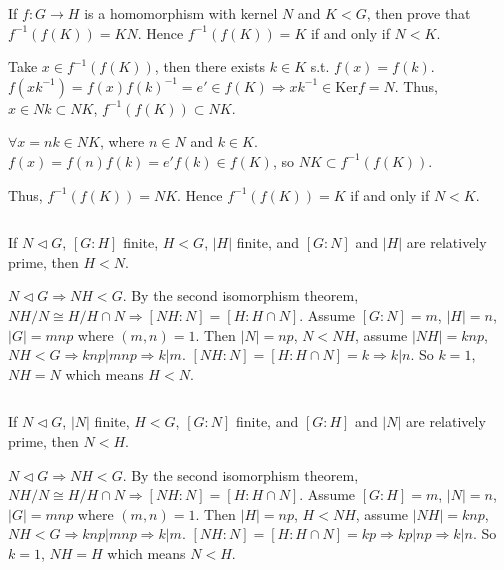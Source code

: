 $$ $$

\begin{ex}
    If $f: G \to H$ is a homomorphism with kernel $N$ and $K<G$, then prove that $f^{-1}(f(K))=KN$. Hence $f^{-1}(f(K))=K$ if and only if $N<K$.
\end{ex}

\begin{answer}
    Take $x\in f^{-1}(f(K))$, then there exists $k\in K$ s.t. $f(x)=f(k)$. $f(xk^{-1})=f(x)f(k)^{-1}=e'\in f(K) \Rightarrow xk^{-1}\in\mathrm{Ker}f=N$. Thus, $x\in Nk\subset NK$, $f^{-1}(f(K))\subset NK$.

    $\forall x=nk\in NK$, where $n\in N$ and $k\in K$. $f(x)=f(n)f(k)=e'f(k)\in f(K)$, so $NK\subset f^{-1}(f(K))$.

    Thus, $f^{-1}(f(K))=NK$. Hence $f^{-1}(f(K))=K$ if and only if $N<K$.
\end{answer}

$$ $$

\begin{ex}
    If $N\lhd G$, $\left[G:H\right]$ finite, $H<G$, $\left| H \right| $ finite, and $\left[G:N\right]$ and $\left| H \right| $ are relatively prime, then $H<N$.
\end{ex}

\begin{answer}
    $N\lhd G\Rightarrow NH<G$. By the second isomorphism theorem, $NH /N\cong H/H\cap N\Rightarrow \left[NH:N\right]=\left[H:H\cap N\right]$. Assume $\left[G:N\right]=m$, $\left| H \right| =n$, $\left| G \right| =mnp$ where $(m,n)=1$. Then $\left| N \right| =np$, $N<NH$, assume $\left| NH \right| =knp$, $NH<G\Rightarrow knp|mnp\Rightarrow k|m$. $\left[NH:N\right]=\left[H:H\cap N\right]=k\Rightarrow k|n$. So $k=1$, $NH=N$ which means $H<N$.
\end{answer}

$$ $$

\begin{ex}
    If $N\lhd G$, $\left| N \right|$ finite, $H<G$, $\left[G:N\right] $ finite, and $\left[G:H\right]$ and $\left| N \right| $ are relatively prime, then $N<H$.
\end{ex}

\begin{answer}
    $N\lhd G\Rightarrow NH<G$. By the second isomorphism theorem, $NH /N\cong H/H\cap N\Rightarrow \left[NH:N\right]=\left[H:H\cap N\right]$. Assume $\left[G:H\right]=m$, $\left| N \right| =n$, $\left| G \right| =mnp$ where $(m,n)=1$. Then $\left| H \right| =np$, $H<NH$, assume $\left| NH \right| =knp$, $NH<G\Rightarrow knp|mnp\Rightarrow k|m$. $\left[NH:N\right]=\left[H:H\cap N\right]=kp\Rightarrow kp|np\Rightarrow k|n$. So $k=1$, $NH=H$ which means $N<H$.
\end{answer}

